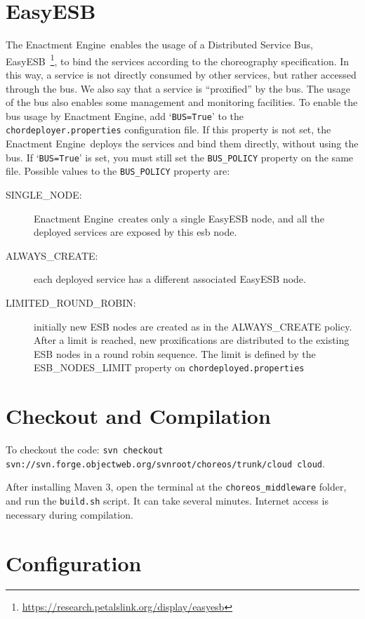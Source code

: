 \documentclass[a4paper, 10pt]{article}
\newcommand{\ee}{Enactment Engine}
\begin{document}
\section{EasyESB}

The \ee\ enables the usage of a Distributed Service Bus, EasyESB~\footnote{\url{https://research.petalslink.org/display/easyesb}}, to bind the services according to the choreography specification. In this way, a service is not directly consumed by other services, but rather accessed through the bus. We also say that a service is ``proxified'' by the bus. The usage of the bus also enables some management and monitoring facilities. To enable the bus usage by \ee, add `\texttt{BUS=True}' to the \texttt{chordeployer.properties} configuration file. If this property is not set, the \ee\ deploys the services and bind them directly, without using the bus. If `\texttt{BUS=True}' is set, you must still set the \texttt{BUS\_POLICY} property on the same file. Possible values to the \texttt{BUS\_POLICY} property are:

\begin{description}
\item [SINGLE\_NODE:] \ee\ creates only a single EasyESB node, and all the deployed services are exposed by this esb node.
\item [ALWAYS\_CREATE:] each deployed service has a different associated EasyESB node. 
\item [LIMITED\_ROUND\_ROBIN:] initially new ESB nodes are created as in the ALWAYS\_CREATE policy. After a limit is reached, new proxifications are distributed to the existing ESB nodes in a round robin sequence. The limit is defined by the ESB\_NODES\_LIMIT property on \texttt{chordeployed.properties}
\end{description}

\section{Checkout and Compilation}

To checkout the code: \texttt{svn checkout svn://svn.forge.objectweb.org/svnroot/choreos/trunk/cloud cloud}. 

After installing Maven 3, open the terminal at the \texttt{choreos\_middleware} folder, and run the \texttt{build.sh} script. It can take several minutes. Internet access is necessary during compilation.

\section{Configuration}
\end{document}
